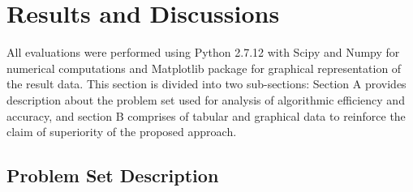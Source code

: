 \documentclass[a4paper,twoside]{article}
\begin{document}







\section{Results and Discussions}

All evaluations were performed using Python 2.7.12 with Scipy\cite{oliphant2007python} and Numpy\cite{van2011numpy} for numerical computations and Matplotlib \cite{Hunter:2007} package for graphical representation of the result data. This section is divided into two sub-sections: Section A provides description about the problem set used for analysis of algorithmic efficiency and accuracy, and section B comprises of tabular and graphical data to reinforce the claim of superiority of the proposed approach.

\subsection{Problem Set Description}
\end{document}
